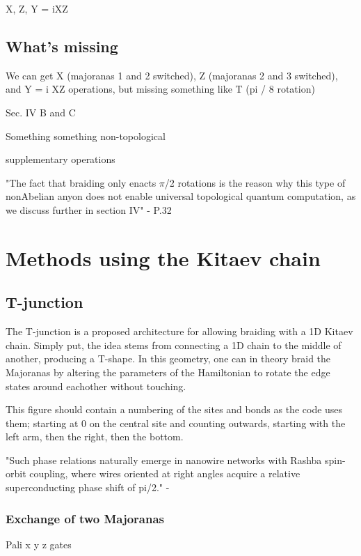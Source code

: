 X, Z, Y = iXZ

\subsection{What's missing}
We can get X (majoranas 1 and 2 switched), Z (majoranas 2 and 3 switched), and Y = i XZ operations, but missing something like T (pi / 8 rotation) 

\cite{nayakNonAbelianAnyonsTopological2008} Sec. IV B and C

Something something non-topological 

supplementary operations

"The fact that braiding
only enacts $\pi$/2 rotations is the reason why this type of nonAbelian anyon does not enable universal topological quantum
computation, as we discuss further in section IV" - P.32 \cite{nayakNonAbelianAnyonsTopological2008}

\section{Methods using the Kitaev chain}


\subsection{T-junction}
The T-junction is a proposed architecture for allowing braiding with a 1D Kitaev chain. Simply put, the idea stems from connecting a 1D chain to the middle of another, producing a T-shape. In this geometry, one can in theory braid the Majoranas by altering the parameters of the Hamiltonian to rotate the edge states around eachother without touching. 

\begin{figure}
    \centering
    \caption{}
    \label{fig:T_junction}
\end{figure}
This figure should contain a numbering of the sites and bonds as the code uses them; starting at 0 on the central site and counting outwards, starting with the left arm, then the right, then the bottom.

"Such phase relations naturally emerge in nanowire networks with Rashba
spin-orbit coupling, where wires oriented at right angles
acquire a relative superconducting phase shift of pi/2." - \cite{sahuNoisyBraidingMajorana2026}

\subsubsection{Exchange of two Majoranas} \label{subsubsec:Exchange_of_two_Majoranas}
Pali x y z gates


